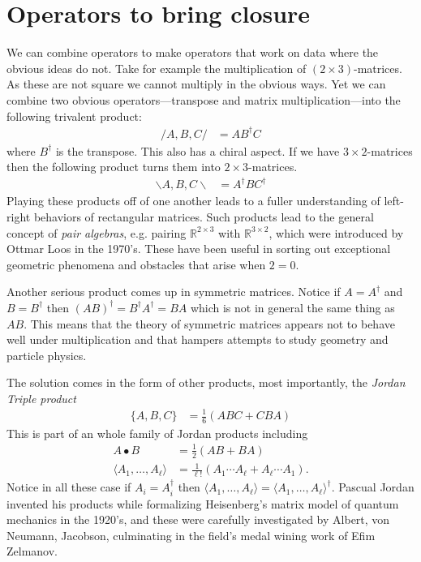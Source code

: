 \section{Operators to bring closure}
We can combine operators to make operators that work on data where the 
obvious ideas do not.  Take for example the multiplication of $(2\times 3)$-matrices.
As these are not square we cannot multiply in the obvious ways.  Yet 
we can combine two obvious operators---transpose and matrix multiplication---into  
the following trivalent product:
\begin{align*}
    /A,B,C/ & = AB^{\dagger}C
\end{align*}
where $B^{\dagger}$ is the transpose.  This also has a chiral aspect.  If we have
$3\times 2$-matrices then the following product turns them into $2\times 3$-matrices.
\begin{align*}
    \backslash A,B,C\backslash & = A^{\dagger} B C^{\dagger}
\end{align*}
Playing these products off of one another leads to a fuller understanding of left-right 
behaviors of rectangular matrices.
Such products lead to the general 
concept of \emph{pair algebras}, e.g. pairing $\mathbb{R}^{2\times 3}$ 
with $\mathbb{R}^{3\times 2}$, which were introduced by Ottmar Loos in the 1970's.
  These have been useful in sorting out exceptional geometric 
phenomena and obstacles that arise when $2=0$.


Another serious product comes up 
in symmetric matrices.  Notice if $A=A^{\dagger}$ and $B=B^{\dagger}$
then $(AB)^{\dagger}=B^{\dagger}A^{\dagger}=BA$ which is not in general 
the same thing as $AB$.  This means that the theory of symmetric matrices 
appears not to behave well under multiplication and that hampers attempts 
to study geometry and particle physics.

The solution comes in the form of other products, most importantly, 
the  \emph{Jordan Triple product}
\begin{align*}
    \{A,B,C\} & = \frac{1}{6}(ABC+CBA)
\end{align*}
This is part of an whole family of Jordan products including 
\begin{align*}
    A\bullet B & = \frac{1}{2}(AB+BA)\\
    \langle A_1,\ldots,A_{\ell}\rangle & = \frac{1}{\ell!}(A_1\cdots A_{\ell}+A_{\ell}\cdots A_1).
\end{align*}
Notice in all these case if $A_i=A_i^{\dagger}$ then $\langle A_1,\ldots,A_{\ell}\rangle=
\langle A_1,\ldots,A_{\ell}\rangle^{\dagger}$.  Pascual Jordan invented his products while formalizing 
Heisenberg's matrix model of quantum mechanics in the 1920's, and these were 
carefully investigated by Albert, von Neumann, Jacobson, culminating in the 
field's medal wining work of Efim Zelmanov.


